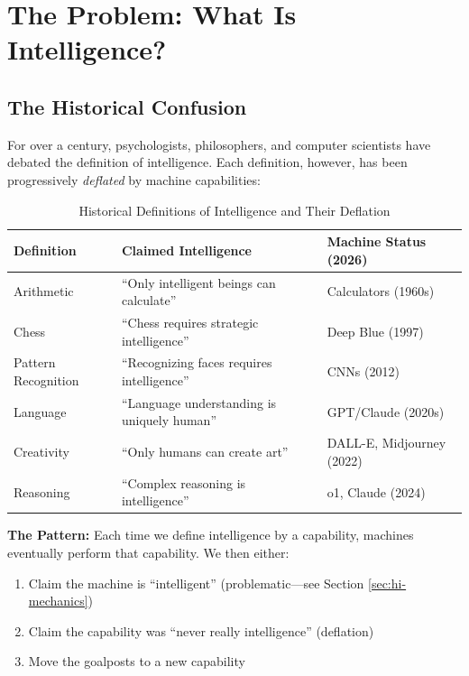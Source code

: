\section{The Problem: What Is Intelligence?}
\label{sec:hi-problem}

\subsection{The Historical Confusion}

For over a century, psychologists, philosophers, and computer scientists have debated the definition of intelligence. Each definition, however, has been progressively \textit{deflated} by machine capabilities:

\begin{table}[htbp]
\centering
\caption{Historical Definitions of Intelligence and Their Deflation}
\label{tab:hi-history}
\renewcommand{\arraystretch}{1.4}
\begin{tabular}{@{}p{3cm}p{4cm}p{5cm}@{}}
\toprule
\textbf{Definition} & \textbf{Claimed Intelligence} & \textbf{Machine Status (2026)} \\
\midrule
Arithmetic & ``Only intelligent beings can calculate'' & Calculators (1960s) \\
Chess & ``Chess requires strategic intelligence'' & Deep Blue (1997) \\
Pattern Recognition & ``Recognizing faces requires intelligence'' & CNNs (2012) \\
Language & ``Language understanding is uniquely human'' & GPT/Claude (2020s) \\
Creativity & ``Only humans can create art'' & DALL-E, Midjourney (2022) \\
Reasoning & ``Complex reasoning is intelligence'' & o1, Claude (2024) \\
\bottomrule
\end{tabular}
\end{table}

\textbf{The Pattern:} Each time we define intelligence by a capability, machines eventually perform that capability. We then either:
\begin{enumerate}
    \item Claim the machine is ``intelligent'' (problematic---see Section \ref{sec:hi-mechanics})
    \item Claim the capability was ``never really intelligence'' (deflation)
    \item Move the goalposts to a new capability
\end{enumerate}

